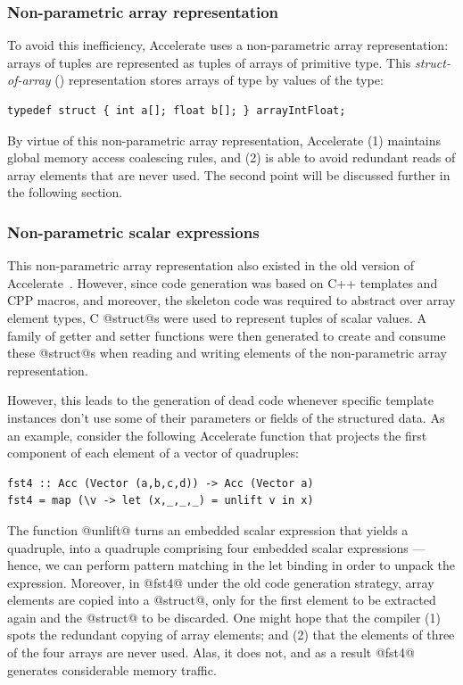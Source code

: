 \subsubsection{Non-parametric array representation}

To avoid this inefficiency, Accelerate uses a non-parametric array
representation: arrays of tuples are represented as tuples of arrays of
primitive type. This \emph{struct-of-array} (\SoA{}) representation stores arrays of type  by values of the type:
%
\begin{lstlisting}[style=cuda]
typedef struct { int a[]; float b[]; } arrayIntFloat;
\end{lstlisting}
%
By virtue of this non-parametric array representation, Accelerate (1) maintains
global memory access coalescing rules, and (2) is able to avoid redundant reads
of array elements that are never used. The second point will be discussed
further in the following section.

\subsubsection{Non-parametric scalar expressions}

This non-parametric array representation also existed in the old version of
Accelerate~\cite{Chakravarty:2011fr}. However, since code generation was based
on C++ templates and CPP macros, and moreover, the skeleton code was required to
abstract over array element types, C @struct@s were used to represent
tuples of scalar values. A family of getter and setter functions were then
generated to create and consume these @struct@s when reading and writing
elements of the non-parametric array representation.

However, this leads to the generation of dead code whenever specific template
instances don't use some of their parameters or fields of the structured data.
As an example, consider the following Accelerate function that projects the
first component of each element of a vector of quadruples:
%
\begin{lstlisting}[style=haskell]
fst4 :: Acc (Vector (a,b,c,d)) -> Acc (Vector a)
fst4 = map (\v -> let (x,_,_,_) = unlift v in x)
\end{lstlisting}
%
The function @unlift@ turns an embedded scalar expression that yields a
quadruple, into a quadruple comprising four embedded scalar expressions ---
hence, we can perform pattern matching in the let binding in order to unpack the
expression. Moreover, in @fst4@ under the old code generation strategy,
array elements are copied into a @struct@, only for the first element to be
extracted again and the @struct@ to be discarded. One might hope that the
\CUDA compiler (1) spots the redundant copying of array elements; and (2) that
the elements of three of the four arrays are never used. Alas, it does not, and
as a result @fst4@ generates considerable memory traffic.

